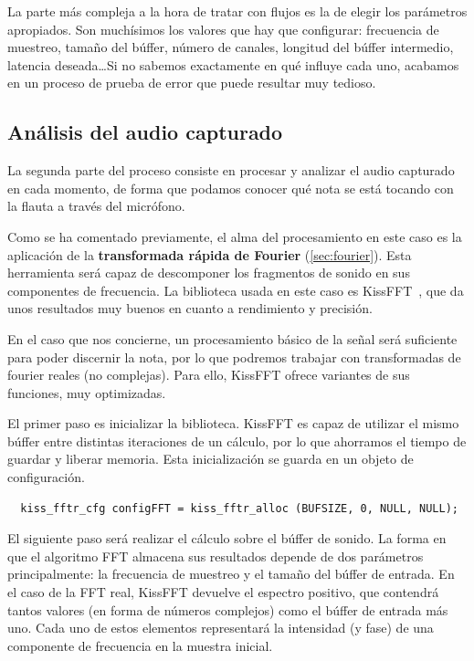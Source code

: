 La parte más compleja a la hora de tratar con flujos es la de elegir los
parámetros apropiados. Son muchísimos los valores que hay que configurar:
frecuencia de muestreo, tamaño del búffer, número de canales, longitud del
búffer intermedio, latencia deseada\ldots Si no sabemos exactamente en qué
influye cada uno, acabamos en un proceso de prueba de error que puede resultar
muy tedioso.

\subsection{Análisis del audio capturado}

La segunda parte del proceso consiste en procesar y analizar el audio capturado
en cada momento, de forma que podamos conocer qué nota se está tocando con la
flauta a través del micrófono.

Como se ha comentado previamente, el alma del procesamiento en este caso es la
aplicación de la \textbf{transformada rápida de Fourier}
(\ref{sec:fourier}). Esta herramienta será capaz de descomponer los fragmentos
de sonido en sus componentes de frecuencia. La biblioteca usada en este caso es
KissFFT~\cite{kissfft}, que da unos resultados muy buenos en cuanto a
rendimiento y precisión. 

En el caso que nos concierne, un procesamiento básico de la señal será
suficiente para poder discernir la nota, por lo que podremos trabajar con
transformadas de fourier reales (no complejas). Para ello, KissFFT ofrece
variantes de sus funciones, muy optimizadas.

El primer paso es inicializar la biblioteca. KissFFT es capaz de utilizar el
mismo búffer entre distintas iteraciones de un cálculo, por lo que ahorramos el
tiempo de guardar y liberar memoria. Esta inicialización se guarda en un objeto
de configuración.

\begin{verbatim}
  kiss_fftr_cfg configFFT = kiss_fftr_alloc (BUFSIZE, 0, NULL, NULL);
\end{verbatim}

El siguiente paso será realizar el cálculo sobre el búffer de sonido.  La forma
en que el algoritmo FFT almacena sus resultados depende de dos parámetros
principalmente: la frecuencia de muestreo y el tamaño del búffer de entrada. En
el caso de la FFT real, KissFFT devuelve el espectro positivo, que contendrá
tantos valores (en forma de números complejos) como el búffer de entrada más
uno. Cada uno de estos elementos representará la intensidad (y fase) de una
componente de frecuencia en la muestra inicial.

